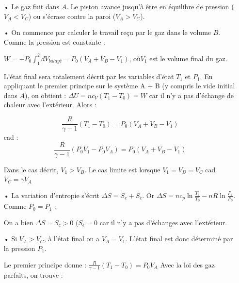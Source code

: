 \documentclass{report}
\begin{document}
\begin{itemize}
	\item[•] Le gaz fuit dans $A$. Le piston avance jusqu'à être en équilibre de pression ($V_A<V_C$) ou s'écrase contre la paroi ($V_A>V_C$).
	\item[•] On commence par calculer le travail reçu par le gaz dans le volume $B$. Comme la pression est constante : 
	
	$W = -P_0\int_1^2 dV_{balayé}=P_0(V_A+V_B-V_1)$, où$V_1$ est le volume final du gaz. 
	
	L'état final sera totalement décrit par les variables d'état $T_1$ et $P_1$. En appliquant le premier principe sur le système {A + B} (y compris le vide initial dans $A$), on obtient : 
	$\Delta U = nc_V(T_1-T_0) = W$ car il n'y a pas d'échange de chaleur avec l'extérieur. Alors :
	
\begin{equation}
	\frac{R}{\gamma-1}(T_1-T_0)=P_0(V_A+V_B-V_1)
\end{equation}
cad :
\begin{equation}
	\frac{R}{\gamma-1}(P_0V_1-P_0V_A)=P_0(V_A+V_B-V_1)
\end{equation} 

\noindent{}

Dans le cas décrit, $V_1>V_B$. Le cas limite est lorsque $V_1=V_B=V_C$ cad $ V_C=\gamma V_A$

\item[•] La variation d'entropie s'écrit $\Delta S = S_e + S_c$.
Or $\Delta S = nc_p\ln\frac{T_1}{T_0} - nR\ln\frac{P_1}{P_0}$. Comme $P_0=P_1$ :

\noindent{}

On a bien $\Delta S =S_c>0$ ($S_e=0$ car il n'y a pas d'échanges avec l'extérieur.

\item[•] Si $V_A>V_C$, à l'état final on a $V_A=V_1$. L'état final est donc déterminé par la pression $P_1$.

Le premier principe donne : $\frac{R}{\gamma-1}(T_1-T_0)=P_0V_A$
Avec la loi des gaz parfaits, on trouve :

\noindent{}

\end{itemize}
\end{document}
